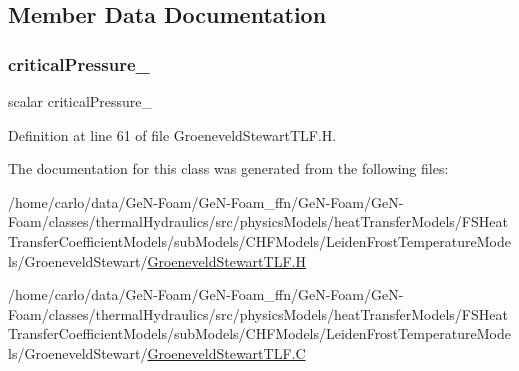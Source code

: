 \subsection{Member Data Documentation}
\mbox{\label{classFoam_1_1LeidenFrostTemperatureModels_1_1GroeneveldStewart_ad6c1bdd73e4a0f4213bb0fd69fbb0a42}} 
\subsubsection{\texorpdfstring{critical\+Pressure\+\_\+}{criticalPressure\_}}
{\footnotesize\ttfamily scalar critical\+Pressure\+\_\+\hspace{0.3cm}{\ttfamily [protected]}}



Definition at line 61 of file Groeneveld\+Stewart\+T\+L\+F.\+H.



The documentation for this class was generated from the following files\+:\begin{DoxyCompactItemize}
\item 
/home/carlo/data/\+Ge\+N-\/\+Foam/\+Ge\+N-\/\+Foam\+\_\+ffn/\+Ge\+N-\/\+Foam/\+Ge\+N-\/\+Foam/classes/thermal\+Hydraulics/src/physics\+Models/heat\+Transfer\+Models/\+F\+S\+Heat\+Transfer\+Coefficient\+Models/sub\+Models/\+C\+H\+F\+Models/\+Leiden\+Frost\+Temperature\+Models/\+Groeneveld\+Stewart/\hyperlink{GroeneveldStewartTLF_8H}{Groeneveld\+Stewart\+T\+L\+F.\+H}\item 
/home/carlo/data/\+Ge\+N-\/\+Foam/\+Ge\+N-\/\+Foam\+\_\+ffn/\+Ge\+N-\/\+Foam/\+Ge\+N-\/\+Foam/classes/thermal\+Hydraulics/src/physics\+Models/heat\+Transfer\+Models/\+F\+S\+Heat\+Transfer\+Coefficient\+Models/sub\+Models/\+C\+H\+F\+Models/\+Leiden\+Frost\+Temperature\+Models/\+Groeneveld\+Stewart/\hyperlink{GroeneveldStewartTLF_8C}{Groeneveld\+Stewart\+T\+L\+F.\+C}\end{DoxyCompactItemize}
